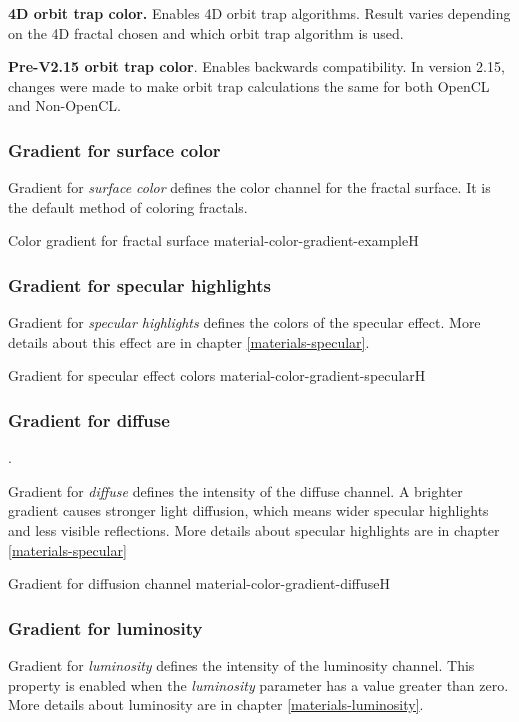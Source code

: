 \textbf{4D orbit trap color.} Enables 4D orbit trap algorithms. Result varies depending on the 4D fractal chosen and which orbit trap algorithm is used.

\textbf{Pre-V2.15 orbit trap color}. Enables backwards compatibility. In version 2.15, changes were made to make orbit trap calculations the same for both OpenCL and  Non-OpenCL.

\subsubsection{Gradient for surface color}\label{materials-surface_color-gradient}

Gradient for \emph{surface color} defines the color channel for the fractal surface. It is the default method of coloring fractals.

{Color gradient for fractal surface}
{material-color-gradient-example}{H}

\subsubsection{Gradient for specular highlights}\label{materials-specular-gradient}

Gradient for \emph{specular highlights} defines the colors of the specular effect. More details about this effect are in chapter \ref{materials-specular}.

{Gradient for specular effect colors}
{material-color-gradient-specular}{H}

\subsubsection{Gradient for diffuse}\label{materials-diffuse-gradient}.

Gradient for \emph{diffuse} defines the intensity of the diffuse channel. A brighter gradient causes stronger light diffusion, which means wider specular highlights and less visible reflections. More details about specular highlights are in chapter \ref{materials-specular}

{Gradient for diffusion channel}
{material-color-gradient-diffuse}{H}

\subsubsection{Gradient for luminosity}\label{materials-luminosity-gradient}
Gradient for \emph{luminosity} defines the intensity of the luminosity channel. This property is enabled when the \emph{luminosity} parameter has a value greater than zero. More details about luminosity are in chapter \ref{materials-luminosity}.

